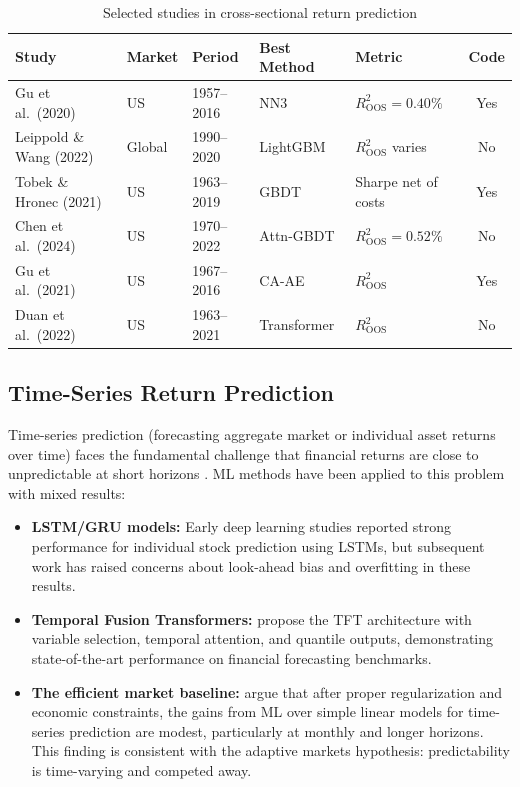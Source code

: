 \begin{table}[H]
\centering
\caption{Selected studies in cross-sectional return prediction}
\label{tab:cross_section}
\footnotesize
\setlength{\tabcolsep}{4pt}
\begin{tabularx}{\textwidth}{@{}p{3.4cm} l l l X c@{}}
\toprule
\textbf{Study} & \textbf{Market} & \textbf{Period} & \textbf{Best Method} & \textbf{Metric} & \textbf{Code} \\
\midrule
Gu et al.\ (2020)        & US     & 1957--2016 & NN3         & $R^2_{\text{OOS}}=0.40\%$ & Yes \\
Leippold \& Wang (2022)  & Global & 1990--2020 & LightGBM    & $R^2_{\text{OOS}}$ varies & No  \\
Tobek \& Hronec (2021)   & US     & 1963--2019 & GBDT        & Sharpe net of costs       & Yes \\
Chen et al.\ (2024)      & US     & 1970--2022 & Attn-GBDT   & $R^2_{\text{OOS}}=0.52\%$ & No  \\
Gu et al.\ (2021)        & US     & 1967--2016 & CA-AE       & $R^2_{\text{OOS}}$        & Yes \\
Duan et al.\ (2022)      & US     & 1963--2021 & Transformer & $R^2_{\text{OOS}}$        & No  \\
\bottomrule
\end{tabularx}
\end{table}

\subsection{Time-Series Return Prediction}

Time-series prediction (forecasting aggregate market or individual asset returns over time) faces the fundamental challenge that financial returns are close to unpredictable at short horizons \citep{Welch2008}. ML methods have been applied to this problem with mixed results:

\begin{itemize}[leftmargin=*]
    \item \textbf{LSTM/GRU models:} Early deep learning studies \citep{Fischer2018, Bao2017} reported strong performance for individual stock prediction using LSTMs, but subsequent work has raised concerns about look-ahead bias and overfitting in these results.

    \item \textbf{Temporal Fusion Transformers:} \citet{Lim2021} propose the TFT architecture with variable selection, temporal attention, and quantile outputs, demonstrating state-of-the-art performance on financial forecasting benchmarks.

    \item \textbf{The efficient market baseline:} \citet{Avramov2023} argue that after proper regularization and economic constraints, the gains from ML over simple linear models for time-series prediction are modest, particularly at monthly and longer horizons. This finding is consistent with the adaptive markets hypothesis: predictability is time-varying and competed away.
\end{itemize}

